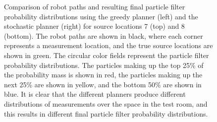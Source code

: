 \documentclass[submit]{aiaa-pretty-modified}
\begin{document}
\begin{figure}
\begin{center}
\caption{Comparison of robot paths and resulting final particle filter
  probability distributions using the greedy planner (left) and the
  stochastic planner (right) for source locations 7 (top) and 8 (bottom). The
  robot paths are shown in black, where each corner represents a
  measurement location, and the true source locations are
  shown in green.  The circular color fields represent the particle
  filter probability distributions.  The particles making up the top 25\% of the
  probability mass is shown in red, the particles making up the next
  25\% are shown in yellow, and the bottom 50\% are shown in blue. It
  is clear that the different planners produce different distributions
of measurements over the space in the test room, and this results in
different final particle filter probability distributions.}
\label{fig:paths}
\end{center}
\end{figure}
\end{document}
